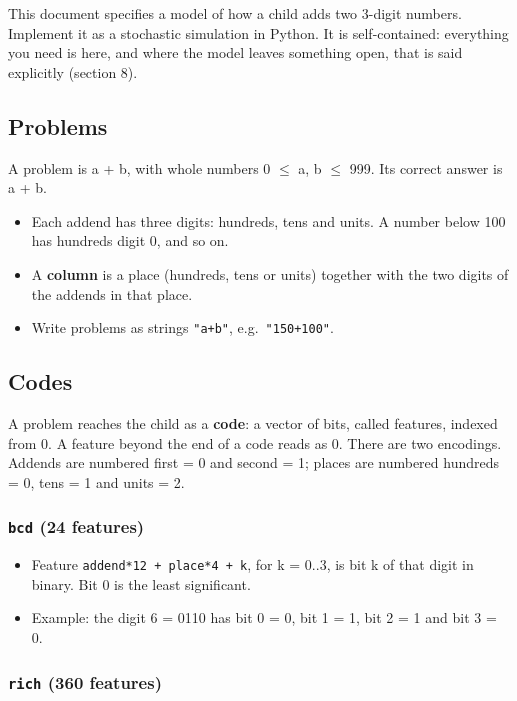 This document specifies a model of how a child adds two 3-digit numbers. Implement it as a stochastic simulation in Python. It is self-contained: everything you need is here, and where the model leaves something open, that is said explicitly (section 8).

\subsection{Problems}\label{problems}

A problem is a + b, with whole numbers 0 $\le$ a, b $\le$ 999. Its correct answer is a + b.

\begin{itemize}
\tightlist
\item
  Each addend has three digits: hundreds, tens and units. A number below 100 has hundreds digit 0, and so on.
\item
  A \textbf{column} is a place (hundreds, tens or units) together with the two digits of the addends in that place.
\item
  Write problems as strings \texttt{"a+b"}, e.g.~\texttt{"150+100"}.
\end{itemize}

\subsection{Codes}\label{codes}

A problem reaches the child as a \textbf{code}: a vector of bits, called features, indexed from 0. A feature beyond the end of a code reads as 0. There are two encodings. Addends are numbered first = 0 and second = 1; places are numbered hundreds = 0, tens = 1 and units = 2.

\subsubsection{\texorpdfstring{\texttt{bcd} (24 features)}{bcd (24 features)}}\label{bcd-24-features}

\begin{itemize}
\tightlist
\item
  Feature \texttt{addend*12\ +\ place*4\ +\ k}, for k = 0..3, is bit k of that digit in binary. Bit 0 is the least significant.
\item
  Example: the digit 6 = 0110 has bit 0 = 0, bit 1 = 1, bit 2 = 1 and bit 3 = 0.
\end{itemize}

\subsubsection{\texorpdfstring{\texttt{rich} (360 features)}{rich (360 features)}}\label{rich-360-features}

